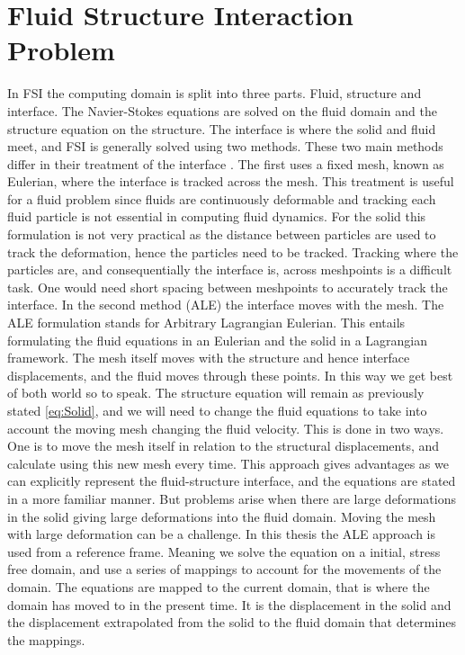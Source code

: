 

\chapter{Fluid Structure Interaction Problem}
In FSI the computing domain is split into three parts. Fluid, structure and interface. The Navier-Stokes equations are solved on the fluid domain and the structure equation on the structure. The interface is where the solid and fluid meet, and FSI is generally solved using two methods. These two main methods differ in their treatment of the interface \cite{Liu2014}. The first uses a fixed mesh, known as Eulerian, where the interface is tracked across the mesh. This treatment is useful for a fluid problem since fluids are continuously deformable and tracking each fluid particle is not essential in computing fluid dynamics. For the solid this formulation is not very practical as the distance between particles are used to track the deformation, hence the particles need to be tracked. Tracking where the particles are, and consequentially the interface is, across meshpoints is a difficult task. One would need short spacing between meshpoints to accurately track the interface. In the second method (ALE) the interface moves with the mesh. 
The ALE formulation stands for Arbitrary Lagrangian Eulerian. This entails formulating the fluid equations in an Eulerian and the solid in a Lagrangian framework. The mesh itself moves with the structure and hence interface displacements, and the fluid moves through these points. In this way we get best of both world so to speak. The structure equation will remain as previously stated \eqref{eq:Solid}, and we will need to change the fluid equations to take into account the moving mesh changing the fluid velocity. This is done in two ways. One is to move the mesh itself in relation to the structural displacements, and calculate using this new mesh every time. 
This approach gives advantages as we can explicitly represent the fluid-structure interface, and the equations are stated in a more familiar manner. But problems arise when there are large deformations in the solid giving large deformations into the fluid domain. Moving the mesh with large deformation can be a challenge. 
In this thesis the ALE approach is used from a reference frame.
Meaning we solve the equation on a initial, stress free domain, and use a series of mappings to account for the movements of the domain. The equations are mapped to the current domain, that is where the domain has moved to in the present time. It is the displacement in the solid and the displacement extrapolated from the solid to the fluid domain that determines the mappings. 
